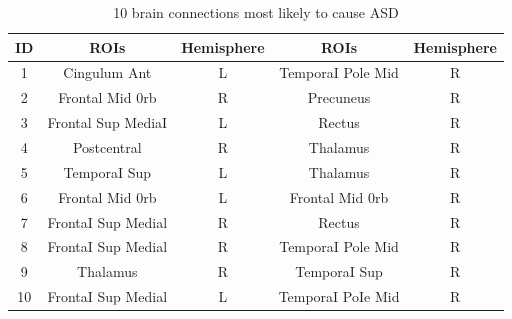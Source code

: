 \documentclass[a4paper]{cas-dc}
\begin{document}
\begin{table}[]
	\tabcolsep=1cm
	\caption{10 brain connections most likely to cause ASD}\label{Table6}
	\begin{tabular*}{\tblwidth}{@{}ccccc@{}}
		\toprule
		\textbf{ID} & \textbf{ROIs}      & \textbf{\textbf{Hemisphere}} & \textbf{\textbf{ROIs}} & \textbf{\textbf{\textbf{\textbf{Hemisphere}}}}  \\  %
		\midrule
		1                               & Cingulum Ant       & L                            & TemporaI Pole Mid      & R                                               \\
		2                               & Frontal Mid 0rb    & R                            & Precuneus              & R                                               \\
		3                               & Frontal Sup MediaI & L                            & Rectus                 & R                                               \\
		4                               & Postcentral        & R                            & Thalamus               & R                                               \\
		5                               & TemporaI Sup       & L                            & Thalamus               & R                                               \\
		6                               & Frontal Mid 0rb    & L                            & Frontal Mid 0rb        & R                                               \\
		7                               & FrontaI Sup Medial & R                            & Rectus                 & R                                               \\
		8                               & FrontaI Sup Medial & R                            & TemporaI Pole Mid      & R                                               \\
		9                               & Thalamus           & R                            & TemporaI Sup           & R                                               \\
		10                              & FrontaI Sup Medial & L                            & TemporaI PoIe Mid      & R \\
		\bottomrule
	\end{tabular*}
\end{table}
\end{document}
